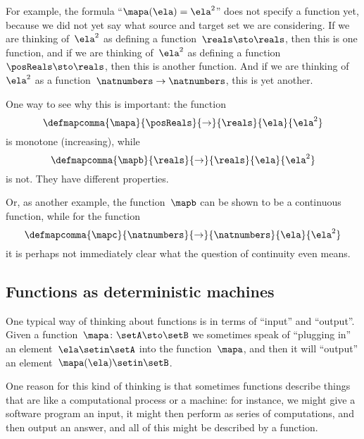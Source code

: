 For example, the formula ``$\mapa(\ela)=\ela^2$'' does not specify a function yet, because we did not yet say what source and target set we are considering.
If we are thinking of~$\ela^2$ as defining a function~$\reals \sto \reals$, then this is one function, and if we are thinking of~$\ela^2$ as defining a function~$\posReals \sto \reals$, then this is another function.
And if we are thinking of~$\ela^2$ as a function~$\natnumbers \to \natnumbers$, this is yet another.

One way to see why this is important: the function
\begin{equation}
    \defmapcomma{
        \mapa
    }{
        \posReals
    }{
        \to
    }{
        \reals
    }{
        \ela
    }{
        \ela^2
    }
\end{equation}
is monotone (increasing), while
\begin{equation}
    \defmapcomma{
        \mapb
    }{
        \reals
    }{
        \to
    }{
        \reals
    }{
        \ela
    }{
        \ela^2
    }
\end{equation}
is not.
They have different properties.

Or, as another example, the function~$\mapb$ can be shown to be a continuous function, while for the function
\begin{equation}
    \defmapcomma{
        \mapc
    }{
        \natnumbers
    }{
        \to
    }{
        \natnumbers
    }{
        \ela
    }{
        \ela^2
    }
\end{equation}
it is perhaps not immediately clear what the question of continuity even means.

\subsection{Functions as deterministic machines}

One typical way of thinking about functions is in terms of ``input'' and ``output''.
Given a function~$\mapa\colon \setA \sto \setB$ we sometimes speak of ``plugging in'' an element~$\ela \setin\setA$ into the function~$\mapa$, and then it will ``output'' an element~$\mapa(\ela) \setin\setB$.

One reason for this kind of thinking is that sometimes functions describe things that are like a computational process or a machine:
for instance, we might give a software program an input, it might then perform as series of computations, and then output an answer, and all of this might be described by a function.

